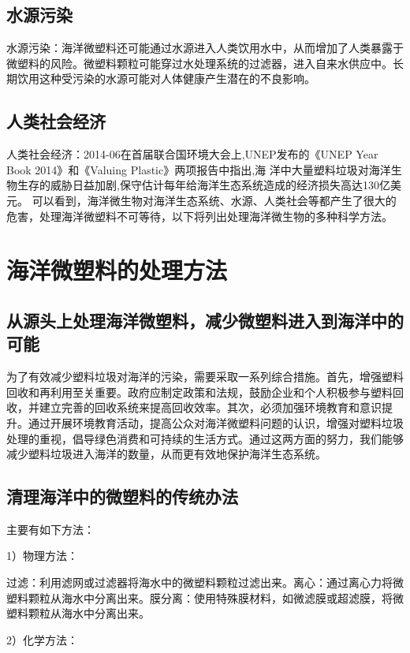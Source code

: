 \documentclass{article}
\begin{document}
    \subsection{水源污染} 水源污染：海洋微塑料还可能通过水源进入人类饮用水中，从而增加了人类暴露于微塑料的风险。微塑料颗粒可能穿过水处理系统的过滤器，进入自来水供应中。长期饮用这种受污染的水源可能对人体健康产生潜在的不良影响。
    
    \subsection{人类社会经济}人类社会经济：2014-06在首届联合国环境大会上,UNEP发布的《UNEP Year Book 2014》和《Valuing Plastic》两项报告中指出,海 洋中大量塑料垃圾对海洋生物生存的威胁日益加剧,保守估计每年给海洋生态系统造成的经济损失高达130亿美元\cite{02}。
    可以看到，海洋微生物对海洋生态系统、水源、人类社会等都产生了很大的危害，处理海洋微塑料不可等待，以下将列出处理海洋微生物的多种科学方法。
    
    
    \section{海洋微塑料的处理方法}
    
    \subsection{从源头上处理海洋微塑料，减少微塑料进入到海洋中的可能}为了有效减少塑料垃圾对海洋的污染，需要采取一系列综合措施。首先，增强塑料回收和再利用至关重要。政府应制定政策和法规，鼓励企业和个人积极参与塑料回收，并建立完善的回收系统来提高回收效率。其次，必须加强环境教育和意识提升。通过开展环境教育活动，提高公众对海洋微塑料问题的认识，增强对塑料垃圾处理的重视，倡导绿色消费和可持续的生活方式。通过这两方面的努力，我们能够减少塑料垃圾进入海洋的数量，从而更有效地保护海洋生态系统。
    
    \subsection{清理海洋中的微塑料的传统办法}
    
    主要有如下方法：
    
    1）物理方法：
    
    过滤：利用滤网或过滤器将海水中的微塑料颗粒过滤出来。离心：通过离心力将微塑料颗粒从海水中分离出来。膜分离：使用特殊膜材料，如微滤膜或超滤膜，将微塑料颗粒从海水中分离出来。
    
    2）化学方法：
    
\end{document}
